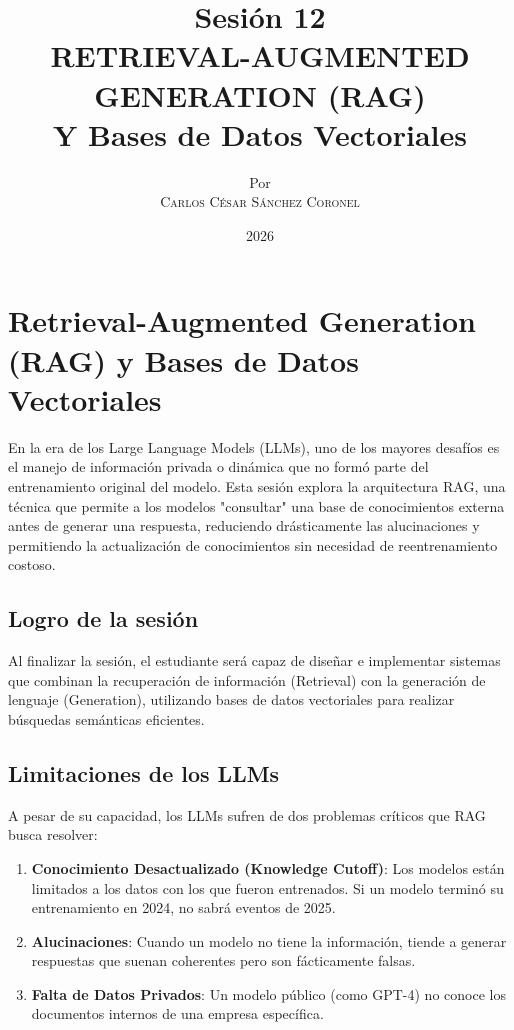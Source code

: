 \documentclass[12pt,a4paper,openany,oneside]{book}
\title{
    \textbf{Sesión 12} \\ 
    \Huge \textbf{RETRIEVAL-AUGMENTED GENERATION (RAG)} \\
    \Large Y Bases de Datos Vectoriales
}
\author{
    \small Por \\ \vspace{0.2cm}
    \Large \textsc{Carlos César Sánchez Coronel}
}
\date{2026}
\begin{document}
\maketitle
\tableofcontents
{}

\chapter{Retrieval-Augmented Generation (RAG) y Bases de Datos Vectoriales}

En la era de los Large Language Models (LLMs), uno de los mayores desafíos es el manejo de información privada o dinámica que no formó parte del entrenamiento original del modelo. Esta sesión explora la arquitectura RAG, una técnica que permite a los modelos "consultar" una base de conocimientos externa antes de generar una respuesta, reduciendo drásticamente las alucinaciones y permitiendo la actualización de conocimientos sin necesidad de reentrenamiento costoso.

\section{Logro de la sesión}
Al finalizar la sesión, el estudiante será capaz de diseñar e implementar sistemas que combinan la recuperación de información (Retrieval) con la generación de lenguaje (Generation), utilizando bases de datos vectoriales para realizar búsquedas semánticas eficientes.

\section{Limitaciones de los LLMs}

A pesar de su capacidad, los LLMs sufren de dos problemas críticos que RAG busca resolver:

\begin{enumerate}
    \item \textbf{Conocimiento Desactualizado (Knowledge Cutoff)}: Los modelos están limitados a los datos con los que fueron entrenados. Si un modelo terminó su entrenamiento en 2024, no sabrá eventos de 2025.
    \item \textbf{Alucinaciones}: Cuando un modelo no tiene la información, tiende a generar respuestas que suenan coherentes pero son fácticamente falsas.
    \item \textbf{Falta de Datos Privados}: Un modelo público (como GPT-4) no conoce los documentos internos de una empresa específica.
\end{enumerate}
\end{document}
